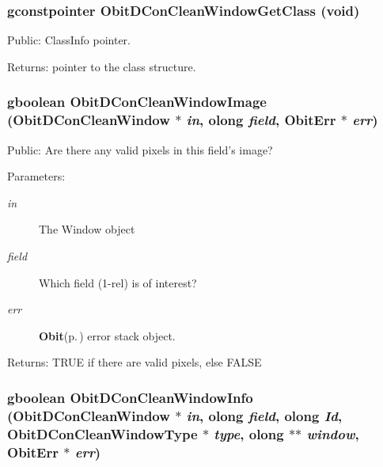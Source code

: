 \subsubsection{\setlength{\rightskip}{0pt plus 5cm}gconstpointer Obit\-DCon\-Clean\-Window\-Get\-Class (void)}\label{ObitDConCleanWindow_8h_a29}


Public: Class\-Info pointer. 

\begin{Desc}
\item[Returns:]pointer to the class structure. \end{Desc}
\subsubsection{\setlength{\rightskip}{0pt plus 5cm}gboolean Obit\-DCon\-Clean\-Window\-Image ({\bf Obit\-DCon\-Clean\-Window} $\ast$ {\em in}, {\bf olong} {\em field}, {\bf Obit\-Err} $\ast$ {\em err})}\label{ObitDConCleanWindow_8h_a38}


Public: Are there any valid pixels in this field's image? 

\begin{Desc}
\item[Parameters:]
\begin{description}
\item[{\em in}]The Window object \item[{\em field}]Which field (1-rel) is of interest? \item[{\em err}]{\bf Obit}{\rm (p.\,\pageref{structObit})} error stack object. \end{description}
\end{Desc}
\begin{Desc}
\item[Returns:]TRUE if there are valid pixels, else FALSE \end{Desc}
\subsubsection{\setlength{\rightskip}{0pt plus 5cm}gboolean Obit\-DCon\-Clean\-Window\-Info ({\bf Obit\-DCon\-Clean\-Window} $\ast$ {\em in}, {\bf olong} {\em field}, {\bf olong} {\em Id}, {\bf Obit\-DCon\-Clean\-Window\-Type} $\ast$ {\em type}, {\bf olong} $\ast$$\ast$ {\em window}, {\bf Obit\-Err} $\ast$ {\em err})}\label{ObitDConCleanWindow_8h_a32}



